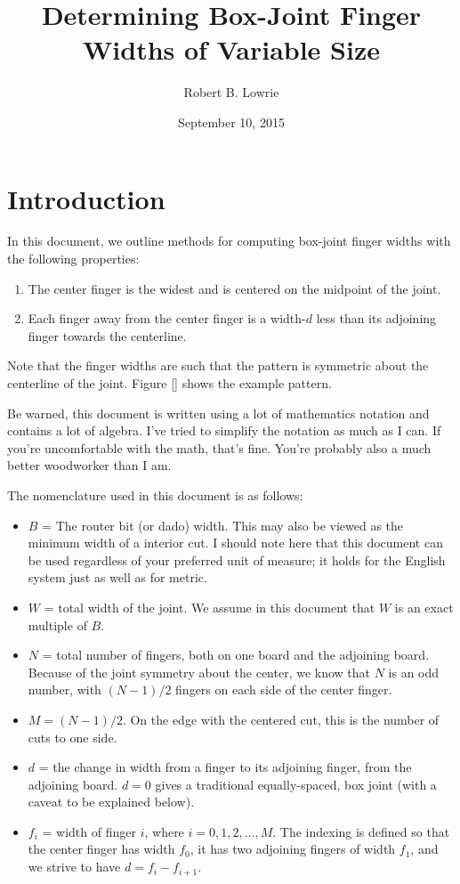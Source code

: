 \documentclass[12pt,final]{article}
\begin{document}
\title{Determining Box-Joint Finger Widths of Variable Size}
\date{September 10, 2015}
\author{Robert B. Lowrie}
\maketitle

\section{Introduction}

In this document, we outline methods for computing box-joint finger widths
with the following properties:
\begin{enumerate}
\item The center finger is the widest and is centered on the midpoint
of the joint.
\item Each finger away from the center finger is a width-$d$ less than
  its adjoining finger towards the centerline.
\end{enumerate}
Note that the finger widths are such that the pattern is symmetric
about the centerline of the joint.  Figure [] shows the example
pattern.

Be warned, this document is written using a lot of mathematics notation and
contains a lot of algebra.  I've tried to simplify the notation as much as I
can.  If you're uncomfortable with the math, that's fine.  You're probably
also a much better woodworker than I am.

The nomenclature used in this document is as follows:
\begin{itemize}
  \item $B$ = The router bit (or dado) width.  This may also be viewed as the
    minimum width of a interior cut.  I should note here that this document
    can be used regardless of your preferred unit of measure; it holds for the
    English system just as well as for metric.
  \item $W$ = total width of the joint.  We assume in this document that $W$
    is an exact multiple of $B$.
  \item $N$ = total number of fingers, both on one board and the
    adjoining board.  Because of the joint symmetry about the center,
    we know that $N$ is an odd number, with $(N-1)/2$
    fingers on each side of the center finger.
  \item $M = (N-1)/2$.  On the edge with the centered cut, this is the number
    of cuts to one side.
  \item $d$ = the change in width from a finger to its adjoining finger,
    from the adjoining board.  $d =
    0$ gives a traditional equally-spaced, box joint (with a caveat to be
    explained below).
  \item $f_i$ = width of finger $i$, where $i = 0, 1, 2, \ldots, M$.
    The indexing is defined so that the center finger has width $f_0$,
    it has two adjoining fingers of width $f_1$, and we strive to have $d = f_{i} -
    f_{i+1}$.
\end{itemize}
\end{document}
